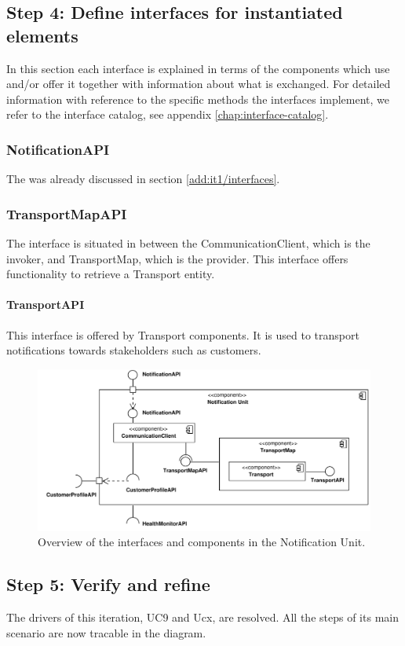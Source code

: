 \subsection{Step 4: Define interfaces for instantiated elements}
\label{add:it8/interfaces}

\npar In this section each interface is explained in terms of the components
which use and/or offer it together with information about what is exchanged. For
detailed information with reference to the specific methods the interfaces
implement, we refer to the interface catalog, see appendix
\ref{chap:interface-catalog}.

\subsubsection{NotificationAPI}

\npar The  was already discussed in section
\ref{add:it1/interfaces}.

\subsubsection{TransportMapAPI}

\npar The  interface is situated in between the
CommunicationClient, which is the invoker, and TransportMap, which is the
provider. This interface offers functionality to retrieve a Transport entity.

\paragraph{TransportAPI}

\npar This interface is offered by Transport components. It is used to transport
notifications towards stakeholders such as customers.

\begin{figure}[H]
	\begin{centering}
		\includegraphics[width=\textwidth]{figs/add-it8-interfaces.pdf}
		\caption{Overview of the interfaces and components in the Notification Unit.}
		\label{fig:it8/interfaces}
	\end{centering}
\end{figure}

\subsection{Step 5: Verify and refine}
\label{add:it8/verification}

\npar The drivers of this iteration, UC9 and Ucx, are resolved. All the steps of
its main scenario are now tracable in the diagram.
